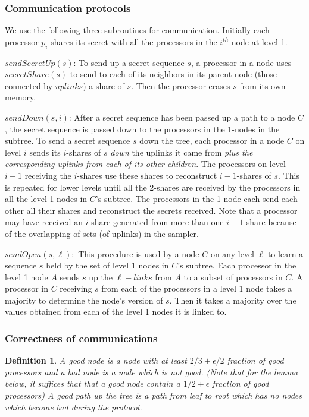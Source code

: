 \documentclass[letterpaper,11pt]{article}
\newtheorem{definition}{Definition}
\begin{document}
\subsubsection{Communication protocols}


We use the following three subroutines for communication.  Initially each processor $p_i$ shares its secret with all the processors in the $i^{th}$ node at level 1.
 
\smallskip
\noindent
$sendSecretUp(s)$: To  send up a secret sequence $s$, a  processor in a node uses $secretShare(s )$  to  send to each of its neighbors in its parent node (those connected by $uplinks$) a share of $s$.  Then the processor erases $s$ from its own memory.

\smallskip
\noindent
$sendDown(s,i)$: After a secret sequence has been passed up a path to a node $C$, the secret sequence is passed down to  the processors in the 1-nodes in the subtree.  To send a secret sequence $s$ down the tree, each processor in a node $C$ on level $i$ sends its $i$-shares of  $s$ {\it down} the uplinks it came from {\it plus the  corresponding uplinks from each of its other children}.  The processors  on level $i-1$ receiving the $i$-shares use these shares to reconstruct  $i-1$-shares of $s$. This is repeated for lower levels until  all the 2-shares are received by the processors in all the level 1 nodes in  $C$'s subtree. The processors in the 1-node  each send each other all their shares and reconstruct the secrets received. Note that a processor may have received an $i$-share generated from more than one $i-1$ share because of the overlapping of sets  (of uplinks) in the sampler.

\smallskip
\noindent
$sendOpen(s, \ell ):$ This procedure is used by a node $C$ on any level $\ell$  to learn a sequence $s$ held by the set of level 1 nodes in $C$'s subtree.  Each processor in the level 1 node  $A$ sends $s$ up the $\ell-links$ from $A$ to a subset of processors in $C$. 
 A processor in $C$ receiving $s$ from each of the processors in a level 1 node takes a majority to determine the node's  version of  $s$.
Then it takes a majority over  the values obtained from each of the level 1 nodes it is linked to.  

\subsubsection{Correctness of communications}\label{s:correct-comm}

\begin{definition} A {\it good node} is a node with at least $2/3 +\epsilon/2$ fraction of good processors and a bad node is a node which is not good.
(Note that for the lemma below, it suffices that that a good node contain a $1/2+ \epsilon$ fraction of good processors)
A {\it good path} up the tree is a path from leaf to root which has no nodes which become bad during the protocol. 
\end{definition}
\end{document}
